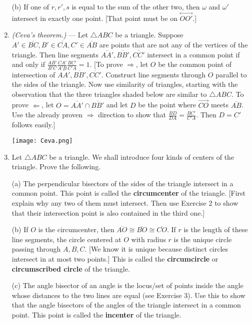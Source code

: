 \documentclass[leqno]{book}
\begin{document}
\begin{enumerate}
(b) If one of $r,r',s$ is equal to the sum of the other two, then $\omega$ and $\omega'$ intersect in exactly one point.  [That point must be on $\overset{\longleftrightarrow}{OO'}$.]

\item\emph{(Ceva's theorem.)} \---- Let $\triangle ABC$ be a triangle.  Suppose $A'\in\overline{BC},B'\in\overline{CA},C'\in\overline{AB}$ are points that are not any of the vertices of the triangle.  Then line segments $\overline{AA'},\overline{BB'},\overline{CC'}$ intersect in a common point if and only if $\frac{AB'}{B'C}\frac{CA'}{A'B}\frac{BC'}{C'A}=1$.
[To prove $\Rightarrow$, let $O$ be the common point of intersection of $\overline{AA'},\overline{BB'},\overline{CC'}$.  Construct line segments through $O$ parallel to the sides of the triangle.  Now use similarity of triangles, starting with the observation that the three triangles shaded below are similar to $\triangle ABC$.  To prove $\Leftarrow$, let $O=\overline{AA'}\cap\overline{BB'}$ and let $D$ be the point where $\overset{\longrightarrow}{CO}$ meets $\overline{AB}$.  Use the already proven $\Rightarrow$ direction to show that $\frac{BD}{DA}=\frac{BC'}{C'A}$.  Then $D=C'$ follows easily.]
\begin{center}\texttt{[image: Ceva.png]}\end{center}

\item Let $\triangle ABC$ be a triangle.  We shall introduce four kinds of centers of the triangle.  Prove the following.

(a) The perpendicular bisectors of the sides of the triangle intersect in a common point.  This point is called the \textbf{circumcenter} of the triangle.  [First explain why any two of them must intersect.  Then use Exercise 2 to show that their intersection point is also contained in the third one.]

(b) If $O$ is the circumcenter, then $\overline{AO}\cong\overline{BO}\cong\overline{CO}$.  If $r$ is the length of these line segments, the circle centered at $O$ with radius $r$ is the unique circle passing through $A,B,C$.  [We know it is unique because distinct circles intersect in at most two points.]  This is called the \textbf{circumcircle} or \textbf{circumscribed circle} of the triangle.

(c) The angle bisector of an angle is the locus/set of points inside the angle whose distances to the two lines are equal (see Exercise 3).  Use this to show that the angle bisectors of the angles of the triangle intersect in a common point.  This point is called the \textbf{incenter} of the triangle.


\end{enumerate}
\end{document}

